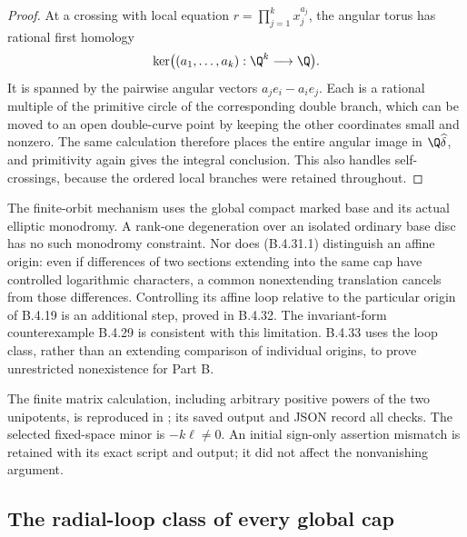 \begin{proof}
At a crossing with local equation
$r=\prod_{j=1}^k x_j^{a_j}$, the angular torus has
rational first homology
\[
 \ker\bigl((a_1,\ldots,a_k):\Q^k\longrightarrow\Q\bigr).
\]
It is spanned by the pairwise angular vectors
$a_j e_i-a_i e_j$. Each is a rational multiple of the
primitive circle of the corresponding double branch,
which can be moved to an open double-curve point by
keeping the other coordinates small and nonzero.
The same calculation therefore places the entire angular
image in $\Q\widehat\delta$, and primitivity again gives
the integral conclusion. This also handles self-crossings,
because the ordered local branches were retained throughout.
\end{proof}

\begin{remark}
The finite-orbit mechanism uses the global compact marked
base and its actual elliptic monodromy. A rank-one degeneration
over an isolated ordinary base disc has no such monodromy
constraint. Nor does (B.4.31.1) distinguish an affine origin:
even if differences of two sections extending into the same
cap have controlled logarithmic characters, a common
nonextending translation cancels from those differences.
Controlling its affine loop relative to the particular
origin of B.4.19 is an additional step, proved in B.4.32.
The invariant-form counterexample B.4.29 is consistent with
this limitation. B.4.33 uses the loop class, rather than
an extending comparison of individual origins, to prove
unrestricted nonexistence for Part B.
\end{remark}

The finite matrix calculation, including arbitrary positive
powers of the two unipotents, is reproduced in
; its saved output and
JSON record all checks. The selected fixed-space minor is
$-k\ell\ne0$. An initial sign-only assertion mismatch is
retained with its exact script and output; it did not affect
the nonvanishing argument.

\subsection{The radial-loop class of every global cap}

